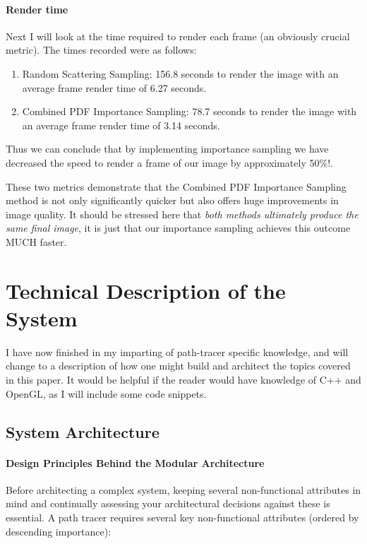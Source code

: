 \documentclass[12pt]{article}
\begin{document}
\paragraph{Render time} Next I will look at the time required to render each frame (an obviously crucial metric). The times recorded were as follows:
\begin{enumerate}
    \item Random Scattering Sampling:
          156.8 seconds to render the image with an average frame render time of 6.27 seconds.

    \item Combined PDF Importance Sampling:
          78.7 seconds to render the image with an average frame render time of 3.14 seconds.
\end{enumerate}

Thus we can conclude that by implementing importance sampling we have decreased the speed to render a frame of our image by approximately 50\%!.

These two metrics demonstrate that the Combined PDF Importance Sampling method is not only significantly quicker but also offers huge improvements in image quality.
It should be stressed here that \textit{both methods ultimately produce the same final image}, it is just that our importance sampling achieves this outcome MUCH faster.

\pagebreak
\section{Technical Description of the System}
\label{sec:system-description}

I have now finished in my imparting of path-tracer specific knowledge, and will change to a description of how one might build and architect the topics covered in this paper. It would be helpful if the reader would have knowledge of C++ and OpenGL, as I will include some code snippets.

\subsection{System Architecture}

\paragraph{Design Principles Behind the Modular Architecture} Before architecting a complex system, keeping several non-functional attributes in mind and continually assessing your architectural decisions against these is essential.
A path tracer requires several key non-functional attributes (ordered by descending importance):
\end{document}
